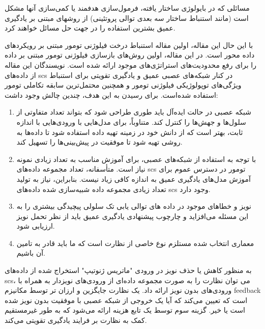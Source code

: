 مسائلی که در بایولوژی ساختار یافته، فرمول‌سازی هدفمند یا کمی‌سازی آنها مشکل است (مانند استنباط ساختار سه بعدی توالی پروتئینی) از روشهای مبتنی بر یادگیری عمیق بشترین استفاده را در جهت حل مسائل خواهند کرد. \cite{senior2020improved}

با این حال این مقاله، اولین مقاله استنباط درخت فیلوژنی تومور مبتنی بر رویکردهای داده محور است. در این مقاله، اولین روش‌های بازسازی فیلوژنی تومور مبتنی بر داده را برای رفع محدودیت‌های استراتژی‌های موجود ارائه شده است. نویسندگان این مقاله از داده‌های \gls{scs} در کنار شبکه‌های عصبی عمیق و یادگیری تقویتی برای استنباط ویژگی‌های توپولوژیکی فیلوژنی تومور و همچنین محتمل‌ترین سابقه تکاملی تومور استفاده شده‌است. برای رسیدن به  این هدف، چندین چالش وجود داشت: 

\begin{enumerate}
	\item     شبکه عصبی در حالت ایده‌آل باید طوری طراحی شود که بتواند تعداد متفاوتی از سلول‌ها و جهش‌ها را کنترل کند.  متناوباً، برای مدل‌هایی با ورودی‌هایی با اندازه ثابت‌، بهتر است که از دانش خود در زمینه تهیه داده استفاده شود تا داده‌ها به روشی تهیه شود تا موفقیت در پیش‌بینی‌ها را تسهیل کند. 
	\item با توجه به استفاده از شبکه‌های عصبی، برای آموزش مناسب به تعداد زیادی نمونه نیاز است. متأسفانه، تعداد مجموعه داده‌های \gls{scs} تومور در دسترس عموم برای آموزش مدل‌های یادگیری عمیق به اندازه کافی زیاد نیست. بنابراین، نیاز به تولید تعداد زیادی مجموعه داده شبیه‌سازی شده داده‌های \gls{scs} وجود دارد.  
	\item نویز و خطاهای موجود در داده های توالی یابی تک سلولی پیچیدگی بیشتری را به این مسئله می‌افزاید و چارچوب پیشنهادی یادگیری عمیق باید از نظر تحمل نویز  ارزیابی شود.  
	\item معماری انتخاب شده مستلزم نوع خاصی از نظارت است که ما باید قادر به تامین آن باشیم.
\end{enumerate}

به منظور کاهش یا حذف نویز در ورودی "ماتریس ژنوتیپ" استخراج شده از داده‌های \gls{scs}، می توان نظارت را به صورت مجموعه داده‌ای از ورودی‌های نویزدار به همراه با ورودی‌های بدون نویز ارائه داد. یک نظارت جایگزین و ارزان تر توسط مکانیزم \gls{feedback} است که تعیین می‌کند که آیا  یک خروجی  از شبکه عصبی با موفقیت بدون نویز شده است یا خیر. گزینه سوم توسط یک تابع هزینه ارائه می‌شود که به طور غیرمستقیم کمک به نظارت بر فرایند یادگیری تقویتی می‌کند. 

